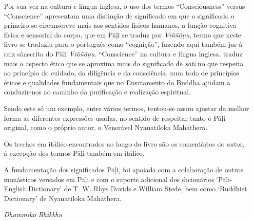 Por sua vez na cultura e língua inglesa, o uso dos termos ``Consciousness'' versus ``Conscience'' apresentam uma distinção de significado em que o significado o primeiro se circunscreve mais aos sentidos físicos humanos, a função cognitiva física e sensorial do corpo, que em Pāḷi se traduz por \emph{Viññāṇa}, termo que neste livro se traduziu para o português como ``cognição'', fazendo aqui também jus à raiz sânscrita do Pāli \emph{Viññāṇa}. ``Conscience'' na cultura e língua inglesa, traduz mais o aspecto ético que se aproxima mais do significado de \emph{sati} no que respeita ao princípio do cuidado, da diligência e da consciência, num todo de princípios éticos e qualidades fundamentais que no Ensinamento do Buddha ajudam a conduzir-nos ao caminho da purificação e realização espiritual.

Sendo este só um exemplo, entre vários termos, tentou-se assim ajustar da melhor forma as diferentes expressões usadas, no sentido de respeitar tanto o Pāḷi original, como o próprio autor, o Venerável Nyanatiloka Mahāthera.

Os trechos em itálico encontrados ao longo do livro são os comentários do autor, à excepção dos termos Pāḷi também em itálico.

A fundamentação dos significados Pāḷi, foi apoiada com a colaboração de outros monásticos versados em Pāḷi e com o suporte adicional dos dicionários `Pāḷi-English Dictionary' de T. W. Rhys Davids e William Stede, bem como `Buddhist Dictionary' de Nyanatiloka Mahāthera.

\emph{Dhammiko Bhikkhu}
